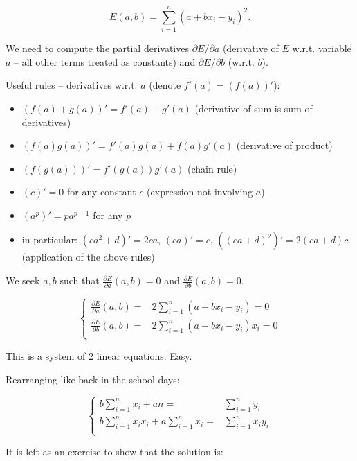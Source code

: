 \documentclass[10pt,b5paper,krantz1]{krantz}
\providecommand{\tightlist}{%
  \setlength{\itemsep}{0pt}\setlength{\parskip}{0pt}}
\begin{document}
\[
E(a,b)   = \displaystyle\sum_{i=1}^n \left( a+bx_i - y_i \right) ^2.
\]

We need to compute the partial derivatives \(\partial E/\partial a\) (derivative of \(E\)
w.r.t. variable \(a\) -- all other terms treated as constants)
and \(\partial E/\partial b\) (w.r.t. \(b\)).

Useful rules -- derivatives w.r.t. \(a\) (denote \(f'(a)=(f(a))'\)):

\begin{itemize}
\tightlist
\item
  \((f(a)+g(a))'=f'(a)+g'(a)\) (derivative of sum is sum of derivatives)
\item
  \((f(a) g(a))' = f'(a)g(a) + f(a)g'(a)\) (derivative of product)
\item
  \((f(g(a)))' = f'(g(a)) g'(a)\) (chain rule)
\item
  \((c)' = 0\) for any constant \(c\) (expression not involving \(a\))
\item
  \((a^p)' = pa^{p-1}\) for any \(p\)
\item
  in particular: \((c a^2+d)'=2ca\), \((ca)'=c\), \(((ca+d)^2)'=2(ca+d)c\) (application of the above rules)
\end{itemize}

We seek \(a,b\) such that \(\frac{\partial E}{\partial a}(a,b) = 0\)
and \(\frac{\partial E}{\partial b}(a,b)=0\).

\[
\left\{
\begin{array}{rl}
\frac{\partial E}{\partial a}(a,b)=&2\displaystyle\sum_{i=1}^n \left( a+bx_i - y_i \right) = 0\\
\frac{\partial E}{\partial b}(a,b)=&2\displaystyle\sum_{i=1}^n \left( a+bx_i - y_i \right) x_i = 0 \\
\end{array}
\right.
\]

This is a system of 2 linear equations. Easy.

Rearranging like back in the school days:

\[
\left\{
\begin{array}{rl}
b \displaystyle\sum_{i=1}^n x_i+ a n = & \displaystyle\sum_{i=1}^n  y_i  \\
b \displaystyle\sum_{i=1}^n x_i x_i + a \displaystyle\sum_{i=1}^n x_i = & \displaystyle\sum_{i=1}^n x_i y_i \\
\end{array}
\right.
\]

It is left as an exercise to show that the solution is:
\end{document}
